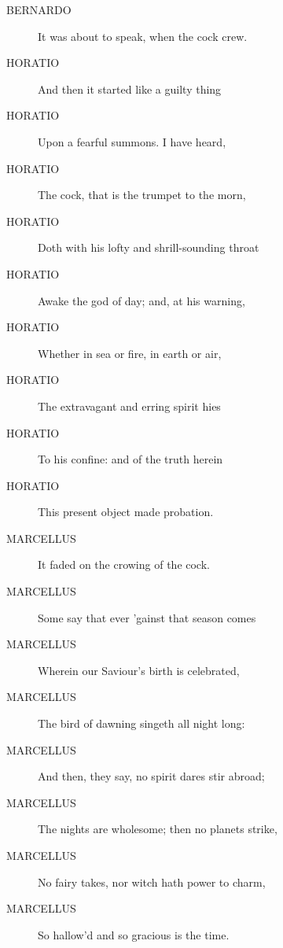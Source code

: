 \documentclass{article}
\begin{document}
\begin{description}
            
\item[BERNARDO] It was about to speak, when the cock crew.
\end{description}
          
\begin{description}
            
\item[HORATIO] And then it started like a guilty thing
\item[HORATIO] Upon a fearful summons. I have heard,
\item[HORATIO] The cock, that is the trumpet to the morn,
\item[HORATIO] Doth with his lofty and shrill-sounding throat
\item[HORATIO] Awake the god of day; and, at his warning,
\item[HORATIO] Whether in sea or fire, in earth or air,
\item[HORATIO] The extravagant and erring spirit hies
\item[HORATIO] To his confine: and of the truth herein
\item[HORATIO] This present object made probation.
\end{description}
          
\begin{description}
            
\item[MARCELLUS] It faded on the crowing of the cock.
\item[MARCELLUS] Some say that ever 'gainst that season comes
\item[MARCELLUS] Wherein our Saviour's birth is celebrated,
\item[MARCELLUS] The bird of dawning singeth all night long:
\item[MARCELLUS] And then, they say, no spirit dares stir abroad;
\item[MARCELLUS] The nights are wholesome; then no planets strike,
\item[MARCELLUS] No fairy takes, nor witch hath power to charm,
\item[MARCELLUS] So hallow'd and so gracious is the time.
\end{description}
          
\end{document}
